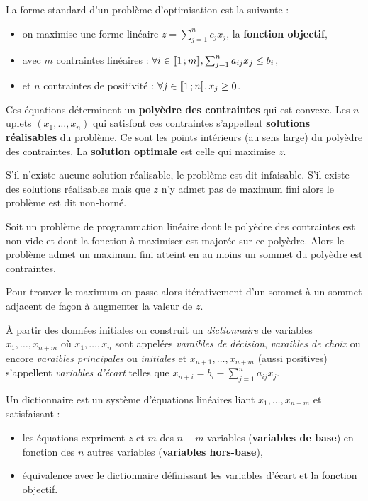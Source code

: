 La forme standard d'un problème d'optimisation est la suivante :
\begin{itemize}
	\item[\textbullet] on maximise une forme linéaire $z = \sum_{j = 1}^n c_j x_j$, la \textbf{fonction objectif},
	\item[\textbullet] avec $m$ contraintes linéaires : $\forall i \in \mathopen{[\![}1\mathclose{}\mathpunct{};m\mathclose{]\!]}, \sum_{j = 1}^n a_{ij}x_j \leq b_i$,
	\item[\textbullet] et $n$ contraintes de positivité : $\forall j \in \mathopen{[\![}1\mathclose{}\mathpunct{};n\mathclose{]\!]}, x_j \geq 0$.
\end{itemize}

Ces équations déterminent un \textbf{polyèdre des contraintes} qui est convexe.
Les $n$-uplets $(x_1,\ldots,x_n)$ qui satisfont ces contraintes s'appellent \textbf{solutions réalisables} du problème.
Ce sont les points intérieurs (au sens large) du polyèdre des contraintes.
La \textbf{solution optimale} est celle qui maximise $z$.

S'il n'existe aucune solution réalisable, le problème est dit infaisable.
S'il existe des solutions réalisables mais que $z$ n'y admet pas de maximum fini alors le problème est dit non-borné.

\begin{thm}
	Soit un problème de programmation linéaire dont le polyèdre des contraintes est non vide et dont la fonction à maximiser est majorée sur ce polyèdre.
	Alors le problème admet un maximum fini atteint en au moins un sommet du polyèdre est contraintes.
\end{thm}

Pour trouver le maximum on passe alors itérativement d'un sommet à un sommet adjacent de façon à augmenter la valeur de $z$.

À partir des données initiales on construit un \emph{dictionnaire} de variables $x_1, \ldots, x_{n + m}$ où $x_1, \ldots, x_n$ sont appelées \emph{varaibles de décision}, \emph{varaibles de choix} ou encore \emph{varaibles principales} ou \emph{initiales} et $x_{n + 1}, \ldots, x_{n + m}$ (aussi positives) s'appellent \emph{variables d'écart} telles que $x_{n + i} = b_i - \sum_{j = 1}^n a_{ij} x_j$.

Un dictionnaire est un système d'équations linéaires liant $x_1, \ldots, x_{n + m}$ et satisfaisant :
\begin{itemize}
	\item[\textbullet] les équations expriment $z$ et $m$ des $n + m$ variables (\textbf{variables de base}) en fonction des $n$ autres variables (\textbf{variables hors-base}),
	\item[\textbullet] équivalence avec le dictionnaire définissant les variables d'écart et la fonction objectif.
\end{itemize}

